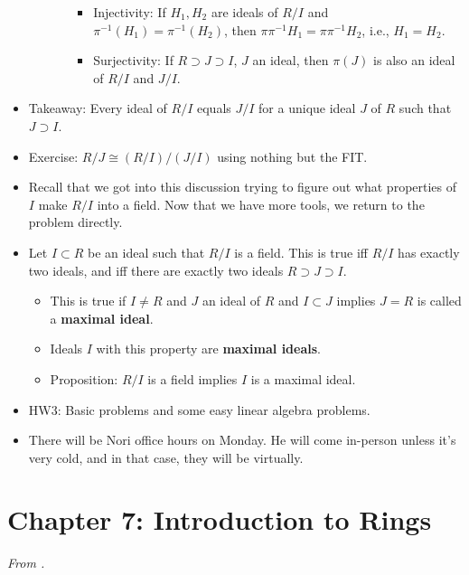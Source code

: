 \documentclass[../notes.tex]{subfiles}
\begin{document}
\begin{itemize}
\begin{itemize}
\begin{enumerate}[label={(\alph*)}]
\begin{itemize}
                \item Injectivity: If $H_1,H_2$ are ideals of $R/I$ and $\pi^{-1}(H_1)=\pi^{-1}(H_2)$, then $\pi\pi^{-1}H_1=\pi\pi^{-1}H_2$, i.e., $H_1=H_2$.
                \item Surjectivity: If $R\supset J\supset I$, $J$ an ideal, then $\pi(J)$ is also an ideal of $R/I$ and $J/I$.
            \end{itemize}
        \end{enumerate}
    \end{itemize}
    \item Takeaway: Every ideal of $R/I$ equals $J/I$ for a unique ideal $J$ of $R$ such that $J\supset I$.
    \item Exercise: $R/J\cong (R/I)/(J/I)$ using nothing but the FIT.
    \item Recall that we got into this discussion trying to figure out what properties of $I$ make $R/I$ into a field. Now that we have more tools, we return to the problem directly.
    \item Let $I\subset R$ be an ideal such that $R/I$ is a field. This is true iff $R/I$ has exactly two ideals, and iff there are exactly two ideals $R\supset J\supset I$.
    \begin{itemize}
        \item This is true if $I\neq R$ and $J$ an ideal of $R$ and $I\subset J$ implies $J=R$ is called a \textbf{maximal ideal}.
        \item Ideals $I$ with this property are \textbf{maximal ideals}.
        \item Proposition: $R/I$ is a field implies $I$ is a maximal ideal.
    \end{itemize}
    \item HW3: Basic problems and some easy linear algebra problems.
    \item There will be Nori office hours on Monday. He will come in-person unless it's very cold, and in that case, they will be virtually.
\end{itemize}



\section{Chapter 7: Introduction to Rings}
\emph{From \textcite{bib:DummitFoote}.}
\end{document}
